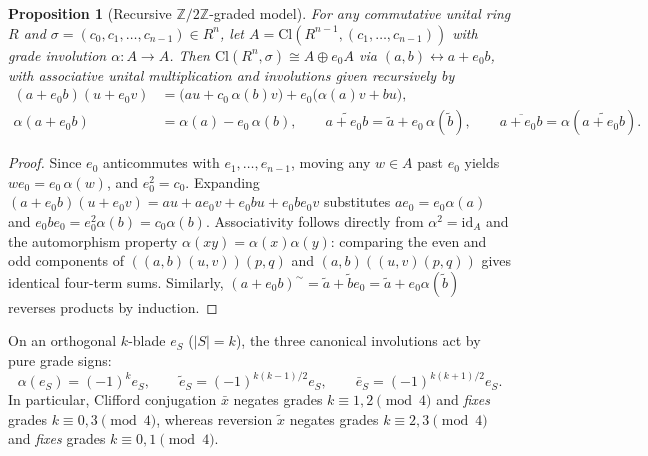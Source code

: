 \documentclass[11pt]{article}
\newtheorem{proposition}[theorem]{Proposition}
\theoremstyle{definition}
\newcommand{\Cl}{\mathrm{Cl}}
\begin{document}
\begin{proposition}[Recursive $\mathbb{Z}/2\mathbb{Z}$-graded model]
\label{prop:recursive}
For any commutative unital ring $R$ and $\sigma = (c_0, c_1, \dots, c_{n-1}) \in R^n$,
let $A = \Cl(R^{n-1}, (c_1, \dots, c_{n-1}))$ with grade involution $\alpha : A \to A$.
Then $\Cl(R^n, \sigma) \cong A \oplus e_0 A$ via $(a, b) \leftrightarrow a + e_0 b$,
with associative unital multiplication and involutions given recursively by
\begin{align}
  (a + e_0 b)(u + e_0 v) &= \bigl(a u + c_0\,\alpha(b) v\bigr) + e_0\bigl(\alpha(a) v + b u\bigr), \\
  \alpha(a + e_0 b) &= \alpha(a) - e_0\,\alpha(b), \qquad
  \widetilde{a + e_0 b} = \tilde{a} + e_0\,\alpha(\tilde{b}), \qquad
  \overline{a + e_0 b} = \alpha(\widetilde{a + e_0 b}).
\end{align}
\end{proposition}
\begin{proof}
Since $e_0$ anticommutes with $e_1, \dots, e_{n-1}$, moving any $w \in A$ past
$e_0$ yields $w e_0 = e_0\,\alpha(w)$, and $e_0^2 = c_0$. Expanding
$(a + e_0 b)(u + e_0 v) = au + a e_0 v + e_0 b u + e_0 b e_0 v$ substitutes
$a e_0 = e_0\alpha(a)$ and $e_0 b e_0 = e_0^2 \alpha(b) = c_0 \alpha(b)$.
Associativity follows directly from $\alpha^2 = \mathrm{id}_A$ and the
automorphism property $\alpha(xy) = \alpha(x)\alpha(y)$: comparing the even and
odd components of $((a,b)(u,v))(p,q)$ and $(a,b)((u,v)(p,q))$ gives identical
four-term sums. Similarly, $(a + e_0 b)^\sim = \tilde{a} + \tilde{b} e_0 =
\tilde{a} + e_0\alpha(\tilde{b})$ reverses products by induction.
\end{proof}

On an orthogonal $k$-blade $e_S$ ($|S| = k$), the three canonical involutions act
by pure grade signs:
\begin{equation}
\label{eq:grade-signs}
  \alpha(e_S) = (-1)^k e_S, \qquad
  \tilde{e}_S = (-1)^{k(k-1)/2} e_S, \qquad
  \bar{e}_S = (-1)^{k(k+1)/2} e_S.
\end{equation}
In particular, Clifford conjugation $\bar{x}$ negates grades $k \equiv 1, 2 \pmod 4$
and \emph{fixes} grades $k \equiv 0, 3 \pmod 4$, whereas reversion $\tilde{x}$
negates grades $k \equiv 2, 3 \pmod 4$ and \emph{fixes} grades $k \equiv 0, 1 \pmod 4$.
\end{document}

